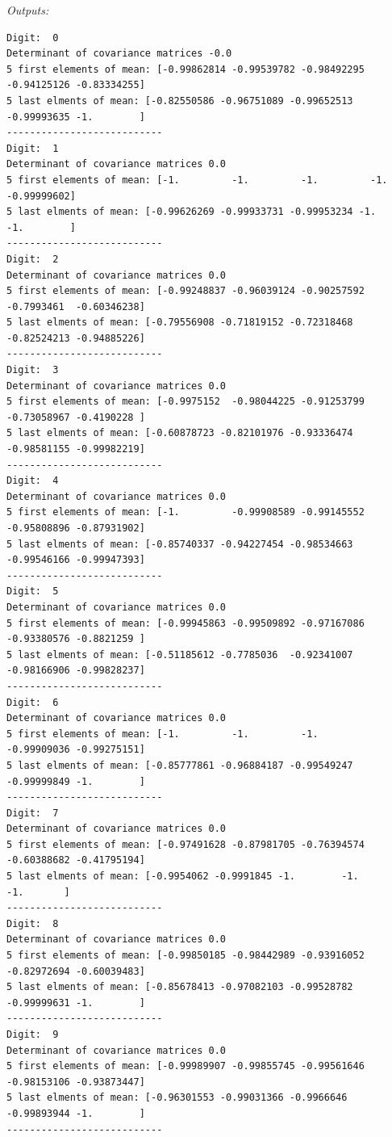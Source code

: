 \documentclass[12pt]{article}
\begin{document}
\textit{Outputs:}
\begin{lstlisting}
Digit:  0
Determinant of covariance matrices -0.0
5 first elements of mean: [-0.99862814 -0.99539782 -0.98492295 -0.94125126 -0.83334255]
5 last elments of mean: [-0.82550586 -0.96751089 -0.99652513 -0.99993635 -1.        ]
---------------------------
Digit:  1
Determinant of covariance matrices 0.0
5 first elements of mean: [-1.         -1.         -1.         -1.         -0.99999602]
5 last elments of mean: [-0.99626269 -0.99933731 -0.99953234 -1.         -1.        ]
---------------------------
Digit:  2
Determinant of covariance matrices 0.0
5 first elements of mean: [-0.99248837 -0.96039124 -0.90257592 -0.7993461  -0.60346238]
5 last elments of mean: [-0.79556908 -0.71819152 -0.72318468 -0.82524213 -0.94885226]
---------------------------
Digit:  3
Determinant of covariance matrices 0.0
5 first elements of mean: [-0.9975152  -0.98044225 -0.91253799 -0.73058967 -0.4190228 ]
5 last elments of mean: [-0.60878723 -0.82101976 -0.93336474 -0.98581155 -0.99982219]
---------------------------
Digit:  4
Determinant of covariance matrices 0.0
5 first elements of mean: [-1.         -0.99908589 -0.99145552 -0.95808896 -0.87931902]
5 last elments of mean: [-0.85740337 -0.94227454 -0.98534663 -0.99546166 -0.99947393]
---------------------------
Digit:  5
Determinant of covariance matrices 0.0
5 first elements of mean: [-0.99945863 -0.99509892 -0.97167086 -0.93380576 -0.8821259 ]
5 last elments of mean: [-0.51185612 -0.7785036  -0.92341007 -0.98166906 -0.99828237]
---------------------------
Digit:  6
Determinant of covariance matrices 0.0
5 first elements of mean: [-1.         -1.         -1.         -0.99909036 -0.99275151]
5 last elments of mean: [-0.85777861 -0.96884187 -0.99549247 -0.99999849 -1.        ]
---------------------------
Digit:  7
Determinant of covariance matrices 0.0
5 first elements of mean: [-0.97491628 -0.87981705 -0.76394574 -0.60388682 -0.41795194]
5 last elments of mean: [-0.9954062 -0.9991845 -1.        -1.        -1.       ]
---------------------------
Digit:  8
Determinant of covariance matrices 0.0
5 first elements of mean: [-0.99850185 -0.98442989 -0.93916052 -0.82972694 -0.60039483]
5 last elments of mean: [-0.85678413 -0.97082103 -0.99528782 -0.99999631 -1.        ]
---------------------------
Digit:  9
Determinant of covariance matrices 0.0
5 first elements of mean: [-0.99989907 -0.99855745 -0.99561646 -0.98153106 -0.93873447]
5 last elments of mean: [-0.96301553 -0.99031366 -0.9966646  -0.99893944 -1.        ]
---------------------------

\end{lstlisting}
\end{document}
